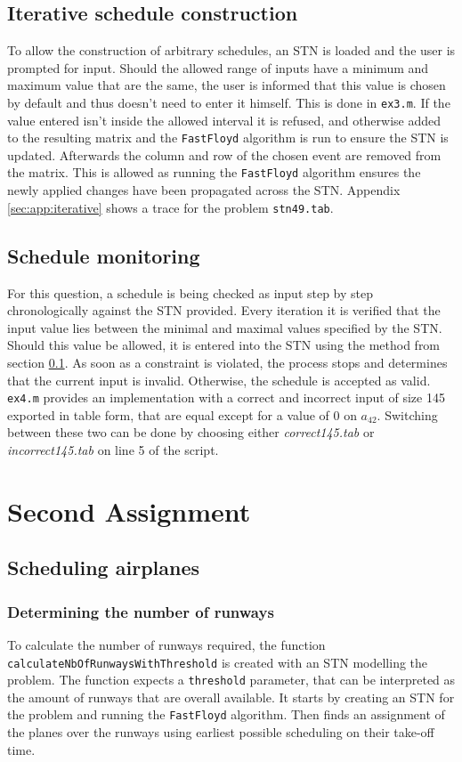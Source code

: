 \documentclass[10pt,a4paper]{article}
\begin{document}
\subsection{Iterative schedule construction}
\label{sec:iterative}
To allow the construction of arbitrary schedules, an STN is loaded and the user is prompted for input. Should the allowed range of inputs have a minimum and maximum value that are the same, the user is informed that this value is chosen by default and thus doesn't need to enter it himself. This is done in \texttt{ex3.m}. If the value entered isn't inside the allowed interval it is refused, and otherwise added to the resulting matrix and the \texttt{FastFloyd} algorithm is run to ensure the STN is updated. Afterwards the column and row of the chosen event are removed from the matrix. This is allowed as running the \texttt{FastFloyd} algorithm ensures the newly applied changes have been propagated across the STN. Appendix \ref{sec:app:iterative} shows a trace for the problem \texttt{stn49.tab}. 

\subsection{Schedule monitoring}
For this question, a schedule is being checked as input step by step chronologically against the STN provided. Every iteration it is verified that the input value lies between the minimal and maximal values specified by the STN. Should this value be allowed, it is entered into the STN using the method from section \ref{sec:iterative}. As soon as a constraint is violated, the process stops and determines that the current input is invalid. Otherwise, the schedule is accepted as valid. \texttt{ex4.m} provides an implementation with a correct and incorrect input of size 145 exported in table form, that are equal except for a value of 0 on $a_{42}$. Switching between these two can be done by choosing either \emph{correct145.tab} or \emph{incorrect145.tab} on line 5 of the script.

\section{Second Assignment}
\subsection{Scheduling airplanes}
\subsubsection{Determining the number of runways}
\label{sec:nb_of_runways}
To calculate the number of runways required, the function  \texttt{calculate\-Nb\-Of\-Run\-ways\-With\-Thres\-hold} is created with an STN modelling the problem. The function expects a \texttt{threshold} parameter, that can be interpreted as the amount of runways that are overall available. It starts by creating an STN for the problem and running the \texttt{FastFloyd} algorithm. Then finds an assignment of the planes over the runways using earliest possible scheduling on their take-off time.
\end{document}
